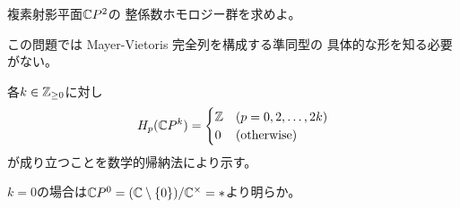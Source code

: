 \documentclass[report]{jlreq}
\begin{document}
\begin{problem}
    複素射影平面$\mathbb{C} P^2$の
    整係数ホモロジー群を求めよ。
\end{problem}

\begin{remark}
    この問題では Mayer-Vietoris 完全列を構成する準同型の
    具体的な形を知る必要がない。
\end{remark}

\begin{answer}
    各$k \in \mathbb{Z}_{\ge 0}$に対し
    \begin{equation}
        H_p(\mathbb{C} P^k) = \begin{cases}
            \mathbb{Z} & (p = 0, 2, \dots, 2k) \\
            0 & (\text{otherwise})
        \end{cases}
    \end{equation}
    が成り立つことを数学的帰納法により示す。

    $k = 0$の場合は$\mathbb{C} P^0 = (\mathbb{C} \setminus \{ 0 \}) / \mathbb{C}^\times = *$より明らか。


\end{answer}
\end{document}
